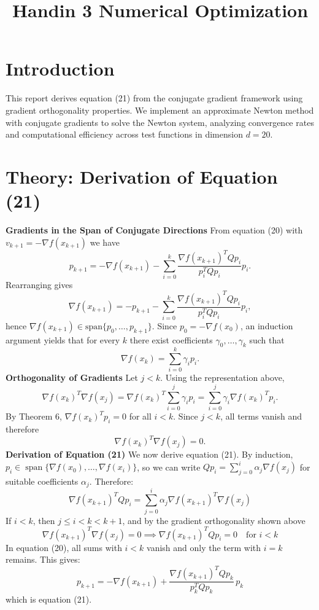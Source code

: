 \documentclass[11pt,a4paper]{article}
\title{\LARGE \textbf{Handin 3 Numerical Optimization}}
\date{}
\begin{document}
\maketitle

\section{Introduction}

This report derives equation (21) from the conjugate gradient framework using gradient orthogonality properties. We implement an approximate Newton method with conjugate gradients to solve the Newton system, analyzing convergence rates and computational efficiency across test functions in dimension $d=20$.

\section{Theory: Derivation of Equation (21)}

\textbf{Gradients in the Span of Conjugate Directions}
\newline
From equation (20) with $v_{k+1} = -\nabla f(x_{k+1})$ we have
\[
p_{k+1}
=
-\nabla f(x_{k+1})
-
\sum_{i=0}^k
\frac{\nabla f(x_{k+1})^T Q p_i}{p_i^T Q p_i} p_i .
\]
Rearranging gives
\[
\nabla f(x_{k+1})
=
- p_{k+1}
-
\sum_{i=0}^k
\frac{\nabla f(x_{k+1})^T Q p_i}{p_i^T Q p_i} p_i ,
\]
hence $\nabla f(x_{k+1}) \in \mathrm{span}\{p_0,\dots,p_{k+1}\}$.
Since $p_0=-\nabla f(x_0)$, an induction argument yields that for every $k$ there exist coefficients $\gamma_0,\dots,\gamma_k$ such that
\[
\nabla f(x_k)=\sum_{i=0}^k \gamma_i p_i .
\]
\textbf{Orthogonality of Gradients}
\newline
Let $j<k$. Using the representation above,
\[
\nabla f(x_k)^T \nabla f(x_j)
=
\nabla f(x_k)^T
\sum_{i=0}^j \gamma_i p_i
=
\sum_{i=0}^j \gamma_i \nabla f(x_k)^T p_i .
\]
By Theorem 6, $\nabla f(x_k)^T p_i=0$ for all $i<k$. Since $j<k$, all terms vanish and therefore
\[
\nabla f(x_k)^T \nabla f(x_j)=0.
\]
\textbf{Derivation of Equation (21)}
\newline
We now derive equation (21). By induction, $p_i \in \operatorname{span}\{\nabla f(x_0),\dots,\nabla f(x_i)\}$, so we can write $Q p_i = \sum_{j=0}^{i} \alpha_j \nabla f(x_j)$ for suitable coefficients $\alpha_j$. Therefore:
\[
\nabla f(x_{k+1})^T Q p_i = \sum_{j=0}^{i} \alpha_j \nabla f(x_{k+1})^T \nabla f(x_j)
\]
If $i<k$, then $j\le i<k<k+1$, and by the gradient orthogonality shown above
\[
\nabla f(x_{k+1})^T \nabla f(x_j) = 0 \implies \nabla f(x_{k+1})^T Q p_i = 0 \quad \text{for } i<k
\]
In equation (20), all sums with $i<k$ vanish and only the term with $i=k$ remains. This gives:
\[
p_{k+1}
=
-\nabla f(x_{k+1})
+
\frac{\nabla f(x_{k+1})^T Q p_k}{p_k^T Q p_k}\, p_k
\]
which is equation (21).
\end{document}
